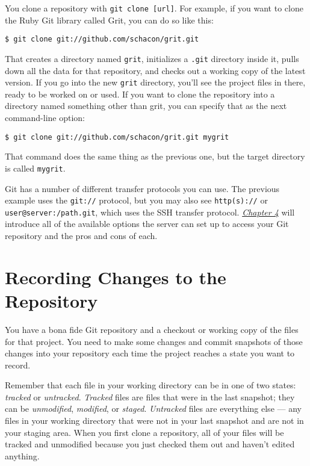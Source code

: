 \documentclass[a4paper]{book}
\newcommand{\prechap}{Chapter }
\newcommand{\postchap}{}
\newcommand{\chapref}[1]{\hyperref[chap:#1]{\prechap #1\postchap}}
\begin{document}
You clone a repository with \texttt{git clone {[}url{]}}. For example, if you want to clone the Ruby Git library called Grit, you can do so like this:

\begin{shaded}\begin{verbatim}
$ git clone git://github.com/schacon/grit.git
\end{verbatim}\end{shaded}

That creates a directory named \texttt{grit}, initializes a \texttt{.git} directory inside it, pulls down all the data for that repository, and checks out a working copy of the latest version. If you go into the new \texttt{grit} directory, you'll see the project files in there, ready to be worked on or used. If you want to clone the repository into a directory named something other than grit, you can specify that as the next command-line option:

\begin{shaded}\begin{verbatim}
$ git clone git://github.com/schacon/grit.git mygrit
\end{verbatim}\end{shaded}

That command does the same thing as the previous one, but the target directory is called \texttt{mygrit}.

Git has a number of different transfer protocols you can use. The previous example uses the \texttt{git://} protocol, but you may also see \texttt{http(s)://} or \texttt{user@server:/path.git}, which uses the SSH transfer protocol. \emph{\chapref{4}} will introduce all of the available options the server can set up to access your Git repository and the pros and cons of each.

\section{Recording Changes to the Repository}

You have a bona fide Git repository and a checkout or working copy of the files for that project. You need to make some changes and commit snapshots of those changes into your repository each time the project reaches a state you want to record.

Remember that each file in your working directory can be in one of two states: \emph{tracked} or \emph{untracked}. \emph{Tracked} files are files that were in the last snapshot; they can be \emph{unmodified}, \emph{modified}, or \emph{staged}. \emph{Untracked} files are everything else --- any files in your working directory that were not in your last snapshot and are not in your staging area. When you first clone a repository, all of your files will be tracked and unmodified because you just checked them out and haven't edited anything.
\end{document}
